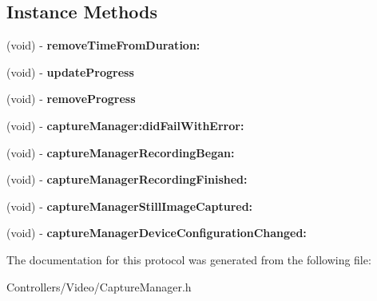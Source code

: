 \subsection*{Instance Methods}
\begin{DoxyCompactItemize}
\item 
\hypertarget{protocol_capture_manager_delegate-p_a2afb6fdc8aa59042978595209465424b}{}(void) -\/ {\bfseries remove\+Time\+From\+Duration\+:}\label{protocol_capture_manager_delegate-p_a2afb6fdc8aa59042978595209465424b}

\item 
\hypertarget{protocol_capture_manager_delegate-p_a1ce37b1170f370a8c0454ee7688ed1f8}{}(void) -\/ {\bfseries update\+Progress}\label{protocol_capture_manager_delegate-p_a1ce37b1170f370a8c0454ee7688ed1f8}

\item 
\hypertarget{protocol_capture_manager_delegate-p_a9a80220f7dc195a8ae3008456761ff57}{}(void) -\/ {\bfseries remove\+Progress}\label{protocol_capture_manager_delegate-p_a9a80220f7dc195a8ae3008456761ff57}

\item 
\hypertarget{protocol_capture_manager_delegate-p_a98d155f913adc00512b72597929354f3}{}(void) -\/ {\bfseries capture\+Manager\+:did\+Fail\+With\+Error\+:}\label{protocol_capture_manager_delegate-p_a98d155f913adc00512b72597929354f3}

\item 
\hypertarget{protocol_capture_manager_delegate-p_a2f95770eae00f4a4b28f3d3c4d2a6125}{}(void) -\/ {\bfseries capture\+Manager\+Recording\+Began\+:}\label{protocol_capture_manager_delegate-p_a2f95770eae00f4a4b28f3d3c4d2a6125}

\item 
\hypertarget{protocol_capture_manager_delegate-p_ac8dea90693f9c8830c0bbb06702486b9}{}(void) -\/ {\bfseries capture\+Manager\+Recording\+Finished\+:}\label{protocol_capture_manager_delegate-p_ac8dea90693f9c8830c0bbb06702486b9}

\item 
\hypertarget{protocol_capture_manager_delegate-p_ab77c7dd7d226f6773affbc52d8987510}{}(void) -\/ {\bfseries capture\+Manager\+Still\+Image\+Captured\+:}\label{protocol_capture_manager_delegate-p_ab77c7dd7d226f6773affbc52d8987510}

\item 
\hypertarget{protocol_capture_manager_delegate-p_adcfa6d2b204def76bba2a0153c6d1e7f}{}(void) -\/ {\bfseries capture\+Manager\+Device\+Configuration\+Changed\+:}\label{protocol_capture_manager_delegate-p_adcfa6d2b204def76bba2a0153c6d1e7f}

\end{DoxyCompactItemize}


The documentation for this protocol was generated from the following file\+:\begin{DoxyCompactItemize}
\item 
Controllers/\+Video/Capture\+Manager.\+h\end{DoxyCompactItemize}
